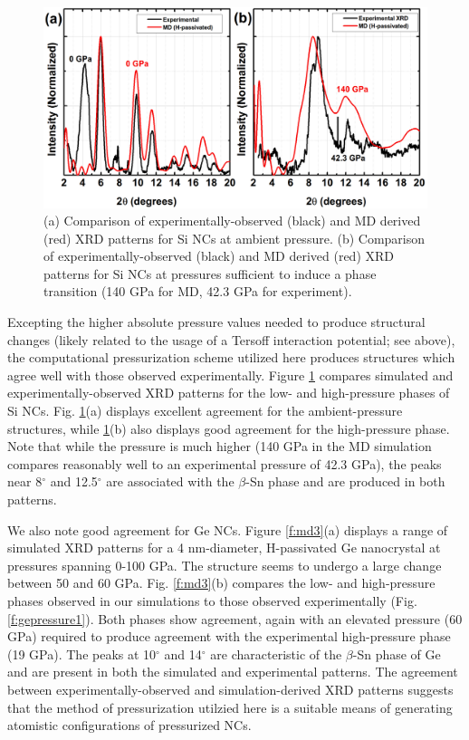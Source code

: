 \begin{figure}
\begin{center}
\includegraphics[width=\textwidth]{./chapter7/md2.png}
\caption[Comparison of simulated and experimental XRD patterns for passivated Si NCs.]{(a) Comparison of experimentally-observed (black) and MD derived (red) XRD patterns for Si NCs at ambient pressure. (b) Comparison of experimentally-observed (black) and MD derived (red) XRD patterns for Si NCs at pressures sufficient to induce a phase transition (140 GPa for MD, 42.3 GPa for experiment).}
\label{f:md2}
\end{center}
\end{figure}

Excepting the higher absolute pressure values needed to produce structural changes (likely related to the usage of a Tersoff interaction potential; see above), the computational pressurization scheme utilized here produces structures which agree well with those observed experimentally.  Figure \ref{f:md2} compares simulated and experimentally-observed XRD patterns for the low- and high-pressure phases of Si NCs. Fig. \ref{f:md2}(a) displays excellent agreement for the ambient-pressure structures, while \ref{f:md2}(b) also displays good agreement for the high-pressure phase. Note that while the pressure is much higher (140 GPa in the MD simulation compares reasonably well to an experimental pressure of 42.3 GPa), the peaks near 8$^{\circ}$ and 12.5$^{\circ}$ are associated with the $\beta$-Sn phase and are produced in both patterns. \par
We also note good agreement for Ge NCs. Figure \ref{f:md3}(a) displays a range of simulated XRD patterns for a 4 nm-diameter, H-passivated Ge nanocrystal at pressures spanning 0-100 GPa. The structure seems to undergo a large change between 50 and 60 GPa. Fig. \ref{f:md3}(b) compares the low- and high-pressure phases observed in our simulations to those observed experimentally (Fig. \ref{f:gepressure1}). Both phases show agreement, again with an elevated pressure (60 GPa) required to produce agreement with the experimental high-pressure phase (19 GPa). The peaks at 10$^{\circ}$ and 14$^{\circ}$ are characteristic of the $\beta$-Sn phase of Ge \cite{PhysRevB.34.362} and are present in both the simulated and experimental patterns. The agreement between experimentally-observed and simulation-derived XRD patterns suggests that the method of pressurization utilzied here is a suitable means of generating atomistic configurations of pressurized NCs.

